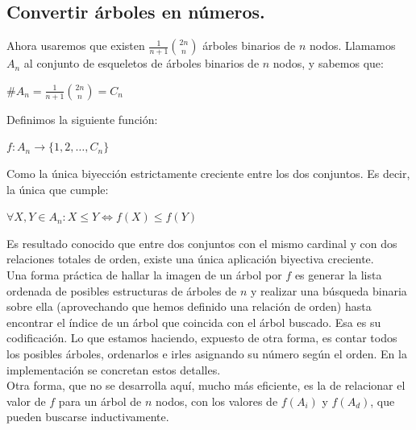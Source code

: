 \documentclass{article}
\renewcommand{\leq}{\leqslant}
\begin{document}
\subsection {Convertir árboles en números.}

Ahora usaremos que existen $\frac{1}{n+1} {2n \choose n}$ árboles binarios de $n$ nodos. Llamamos $A_n$ al conjunto de esqueletos de árboles binarios
de $n$ nodos, y sabemos que:
\begin{adjustwidth}{2cm}{}
$\#A_n = \frac{1}{n+1} {2n \choose n} = C_n$ \\
\end{adjustwidth}

Definimos la siguiente función:
\begin{adjustwidth}{2cm}{}
 $f : A_n \longrightarrow \{1,2,\dots,C_n\}$ 
\end{adjustwidth}
Como la única biyección estrictamente creciente entre los dos conjuntos. Es decir, la única que cumple:
\begin{adjustwidth}{2cm}{}
 $\displaystyle \forall X,Y \in A_n : X \leq Y \Longleftrightarrow f(X) \leq f(Y)$
\end{adjustwidth}
Es resultado conocido que entre dos conjuntos con el mismo cardinal y con dos relaciones totales de orden,
existe una única aplicación biyectiva creciente. \\

Una forma práctica de hallar la imagen de un árbol por $f$ es generar la lista ordenada de posibles estructuras de árboles de $n$ y
realizar una búsqueda binaria sobre ella (aprovechando que hemos definido una relación de orden) hasta encontrar el índice
de un árbol que coincida con el árbol buscado. Esa es su codificación. 
 Lo que estamos haciendo, expuesto de otra forma, es contar todos los posibles árboles, ordenarlos e irles asignando su número según el orden.
 En la implementación se concretan estos detalles.\\

Otra forma, que no se desarrolla aquí, mucho más
eficiente, es la de relacionar el valor de $f$ para un árbol de $n$ nodos, con los valores de $f(A_i)$ y $f(A_d)$, que pueden buscarse inductivamente.
\end{document}
